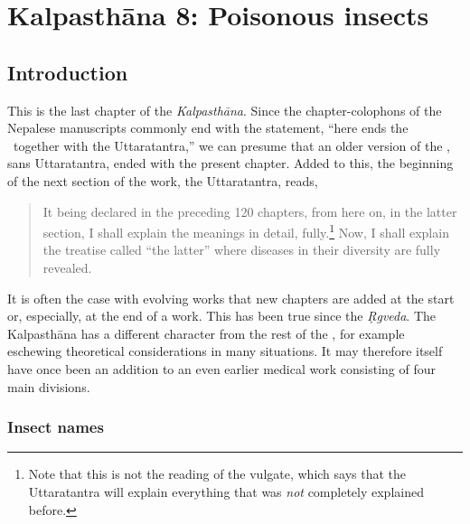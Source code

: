 \chapter{Kalpasthāna 8: Poisonous insects}

\section{Introduction} 

This is the last chapter of the \emph{Kalpasthāna}.  Since the
chapter-colophons of the Nepalese manuscripts commonly end with the
statement, “here ends the \SS\ together with the Uttaratantra,” we can
presume that an older version of the \SS, sans Uttaratantra, ended
with the present chapter.  Added to this, the beginning of the next
section of the work, the Uttaratantra, reads,
\begin{quote}
    It being declared in the preceding 120
chapters, from here on, in the latter section, I shall explain the
meanings in detail, fully.\footnote{Note that this is not the reading
    of the vulgate, which says that the Uttaratantra will explain
    everything that was \emph{not} completely explained before.}  Now, I
    shall explain the treatise called “the latter” where diseases
    in their diversity are fully revealed.
    \end{quote}
It is often the case with evolving works that new chapters are added
at the start or, especially, at the end of a work.  This has been true
since the \emph{Ṛgveda}.  The Kalpasthāna has a different character
from the rest of the \SS, for example eschewing theoretical
considerations in many situations.  It may therefore itself have once
been an addition to an even earlier medical work consisting of four main
divisions.

    
\subsection{Insect names}


